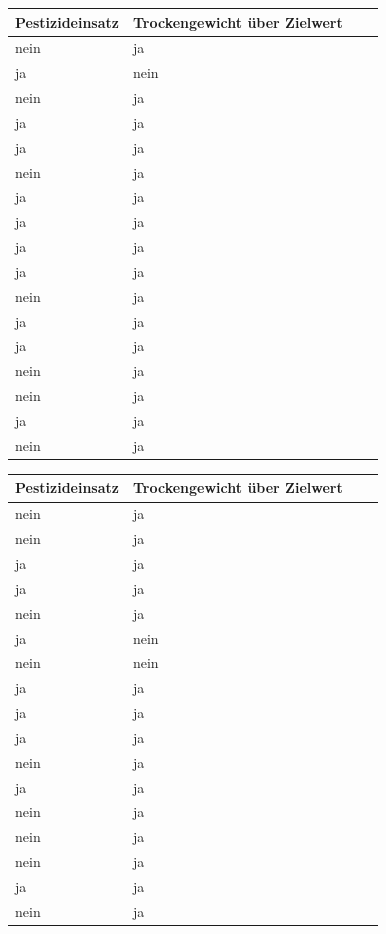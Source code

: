 \documentclass[a4paper, 9pt]{scrartcl}\usepackage[]{graphicx}\usepackage[]{xcolor}
\begin{document}
\begin{center}
\begin{minipage}[t]{0.45\textwidth}
\begin{center}

\begin{tabular}{p{2.5cm}p{2.5cm}p{2.5cm}p{2.5cm}}
\toprule
Pestizideinsatz & Trockengewicht über Zielwert\\
\midrule
nein & ja\\
ja & nein\\
nein & ja\\
ja & ja\\
ja & ja\\
\addlinespace
nein & ja\\
ja & ja\\
ja & ja\\
ja & ja\\
ja & ja\\
\addlinespace
nein & ja\\
ja & ja\\
ja & ja\\
nein & ja\\
nein & ja\\
\addlinespace
ja & ja\\
nein & ja\\
\bottomrule
\end{tabular}


\end{center}
\end{minipage}
\begin{minipage}[t]{0.45\textwidth}
\begin{center}

\begin{tabular}{p{2.5cm}p{2.5cm}p{2.5cm}p{2.5cm}}
\toprule
Pestizideinsatz & Trockengewicht über Zielwert\\
\midrule
nein & ja\\
nein & ja\\
ja & ja\\
ja & ja\\
nein & ja\\
\addlinespace
ja & nein\\
nein & nein\\
ja & ja\\
ja & ja\\
ja & ja\\
\addlinespace
nein & ja\\
ja & ja\\
nein & ja\\
nein & ja\\
nein & ja\\
\addlinespace
ja & ja\\
nein & ja\\
\bottomrule
\end{tabular}


\end{center}
\end{minipage}
\end{center}
\end{document}
